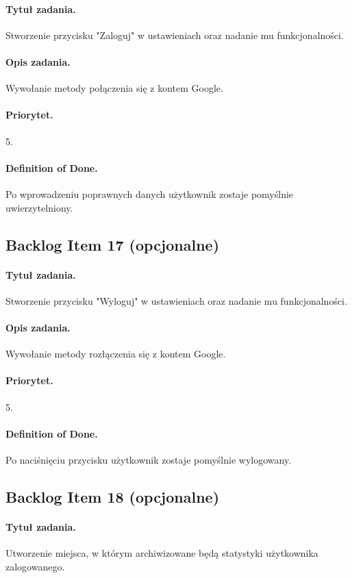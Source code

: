 \documentclass[a4paper]{article}
\begin{document}
\paragraph{Tytuł zadania.} Stworzenie przycisku "Zaloguj" w ustawieniach oraz nadanie mu funkcjonalności.
\paragraph{Opis zadania.} Wywołanie metody połączenia się z kontem Google.
\paragraph{Priorytet.} 5.
\paragraph{Definition of Done.} Po wprowadzeniu poprawnych danych użytkownik zostaje pomyślnie uwierzytelniony.

\subsection{Backlog Item 17 (opcjonalne)}
\paragraph{Tytuł zadania.} Stworzenie przycisku "Wyloguj" w ustawieniach oraz nadanie mu funkcjonalności.
\paragraph{Opis zadania.} Wywołanie metody rozłączenia się z kontem Google.
\paragraph{Priorytet.} 5.
\paragraph{Definition of Done.} Po naciśnięciu przycisku użytkownik zostaje pomyślnie wylogowany.

\subsection{Backlog Item 18 (opcjonalne)}
\paragraph{Tytuł zadania.} Utworzenie miejsca, w którym archiwizowane będą statystyki użytkownika zalogowanego.
\end{document}
